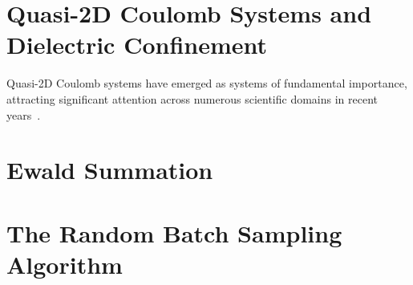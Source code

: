 \section{Quasi-2D Coulomb Systems and Dielectric Confinement}

Quasi-2D Coulomb systems have emerged as systems of fundamental importance, attracting significant attention across numerous scientific domains in recent years~\cite{guidelines}.

\section{Ewald Summation}

\section{The Random Batch Sampling Algorithm}